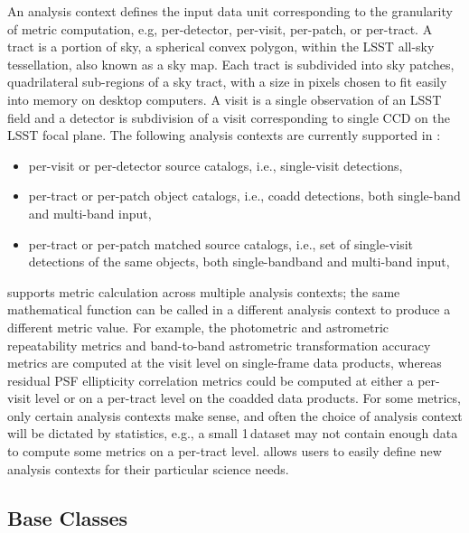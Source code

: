 An analysis context defines the input data unit corresponding to the granularity of metric computation, e.g, per-detector, per-visit, per-patch, or per-tract.
A tract is a portion of sky, a spherical convex polygon,  within the LSST all-sky tessellation, also known as a sky map. 
Each tract is subdivided into sky patches,  quadrilateral sub-regions of a sky tract, with a size in pixels chosen to fit easily into memory on desktop computers. 
A visit is a single observation of an LSST field and a detector is subdivision of a visit corresponding to single CCD on the LSST focal plane. 
The following analysis contexts are currently supported in \faro:
\begin{itemize}
\item per-visit or per-detector source catalogs, i.e., single-visit detections,
\item per-tract or per-patch object catalogs, i.e., coadd detections, both single-band and multi-band input,
\item per-tract or per-patch matched source catalogs, i.e., set of single-visit detections of the same objects, both single-bandband and multi-band input,
\end{itemize}

\faro supports metric calculation across multiple analysis contexts; the same mathematical function can be called in a different analysis context to produce a different metric value.
For example, the photometric and astrometric repeatability metrics and band-to-band astrometric transformation accuracy metrics are computed at the visit level on single-frame data products, whereas residual PSF ellipticity correlation metrics could be computed at either a per-visit level or on a per-tract level on the coadded data products.
For some metrics, only certain analysis contexts make sense, and often the choice of analysis context will be dictated by statistics, e.g., a small 1\,\degsq  dataset may not contain enough data to compute some metrics on a per-tract level.
\faro allows users to easily define new analysis contexts for their particular science needs.

\subsection{Base Classes} \label{ssec:base_classes}

